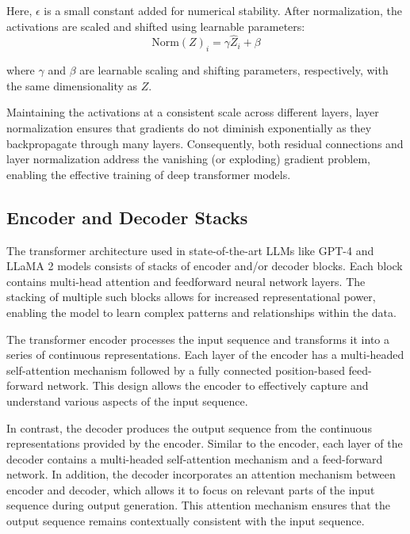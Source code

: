 Here, \( \epsilon \) is a small constant added for numerical stability. After normalization, the activations are scaled and shifted using learnable parameters:
\begin{equation}
\text{Norm}(Z)_i = \gamma \hat{Z}_i + \beta
\end{equation}

where \( \gamma \) and \( \beta \) are learnable scaling and shifting parameters, respectively, with the same dimensionality as \( Z \).

Maintaining the activations at a consistent scale across different layers, layer normalization ensures that gradients do not diminish exponentially as they backpropagate through many layers. Consequently, both residual connections and layer normalization address the vanishing (or exploding) gradient problem, enabling the effective training of deep transformer models.

\subsection{Encoder and Decoder Stacks}

The transformer architecture used in state-of-the-art LLMs like GPT-4 \cite{achiam2023gpt} and LLaMA 2 \cite{touvron2023llama} models consists of stacks of encoder and/or decoder blocks. Each block contains multi-head attention and feedforward neural network layers. The stacking of multiple such blocks allows for increased representational power, enabling the model to learn complex patterns and relationships within the data.

The transformer encoder processes the input sequence and transforms it into a series of continuous representations. Each layer of the encoder has a multi-headed self-attention mechanism followed by a fully connected position-based feed-forward network. This design allows the encoder to effectively capture and understand various aspects of the input sequence.

In contrast, the decoder produces the output sequence from the continuous representations provided by the encoder. Similar to the encoder, each layer of the decoder contains a multi-headed self-attention mechanism and a feed-forward network. In addition, the decoder incorporates an attention mechanism between encoder and decoder, which allows it to focus on relevant parts of the input sequence during output generation. This attention mechanism ensures that the output sequence remains contextually consistent with the input sequence.

